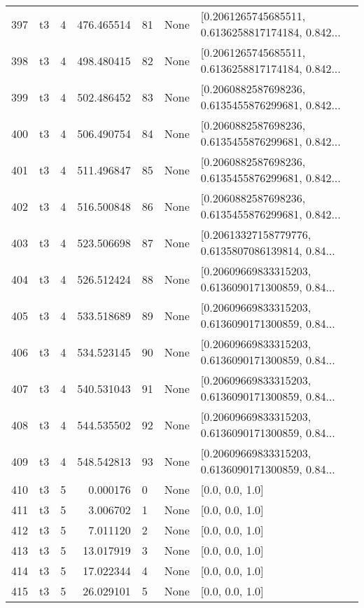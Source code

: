 \begin{tabular}{lllrlll}
397 &  t3 &   4 &  476.465514 &   81 &  None &  [0.2061265745685511, 0.6136258817174184, 0.842... \\
398 &  t3 &   4 &  498.480415 &   82 &  None &  [0.2061265745685511, 0.6136258817174184, 0.842... \\
399 &  t3 &   4 &  502.486452 &   83 &  None &  [0.2060882587698236, 0.6135455876299681, 0.842... \\
400 &  t3 &   4 &  506.490754 &   84 &  None &  [0.2060882587698236, 0.6135455876299681, 0.842... \\
401 &  t3 &   4 &  511.496847 &   85 &  None &  [0.2060882587698236, 0.6135455876299681, 0.842... \\
402 &  t3 &   4 &  516.500848 &   86 &  None &  [0.2060882587698236, 0.6135455876299681, 0.842... \\
403 &  t3 &   4 &  523.506698 &   87 &  None &  [0.20613327158779776, 0.6135807086139814, 0.84... \\
404 &  t3 &   4 &  526.512424 &   88 &  None &  [0.20609669833315203, 0.6136090171300859, 0.84... \\
405 &  t3 &   4 &  533.518689 &   89 &  None &  [0.20609669833315203, 0.6136090171300859, 0.84... \\
406 &  t3 &   4 &  534.523145 &   90 &  None &  [0.20609669833315203, 0.6136090171300859, 0.84... \\
407 &  t3 &   4 &  540.531043 &   91 &  None &  [0.20609669833315203, 0.6136090171300859, 0.84... \\
408 &  t3 &   4 &  544.535502 &   92 &  None &  [0.20609669833315203, 0.6136090171300859, 0.84... \\
409 &  t3 &   4 &  548.542813 &   93 &  None &  [0.20609669833315203, 0.6136090171300859, 0.84... \\
410 &  t3 &   5 &    0.000176 &    0 &  None &                                    [0.0, 0.0, 1.0] \\
411 &  t3 &   5 &    3.006702 &    1 &  None &                                    [0.0, 0.0, 1.0] \\
412 &  t3 &   5 &    7.011120 &    2 &  None &                                    [0.0, 0.0, 1.0] \\
413 &  t3 &   5 &   13.017919 &    3 &  None &                                    [0.0, 0.0, 1.0] \\
414 &  t3 &   5 &   17.022344 &    4 &  None &                                    [0.0, 0.0, 1.0] \\
415 &  t3 &   5 &   26.029101 &    5 &  None &                                    [0.0, 0.0, 1.0] \\

\end{tabular}
